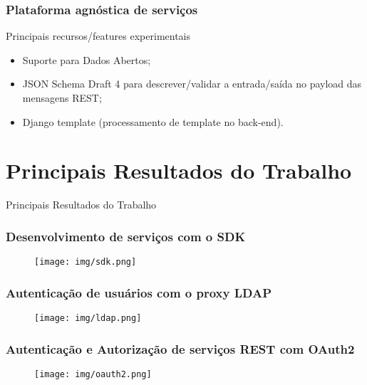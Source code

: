 \documentclass{beamer}
\begin{document}
\begin{frame}
  \frametitle{Plataforma agnóstica de serviços}

  \begin{exampleblock}{Principais recursos/features experimentais}
  
	  \begin{itemize}
 	    \item<1->Suporte para Dados Abertos;
    	    \item<1->JSON Schema Draft 4 para descrever/validar a entrada/saída no payload das mensagens REST;
	    \item<1->Django template (processamento de template no back-end).
	  \end{itemize}

  \end{exampleblock}

  
\end{frame}







\section{Principais Resultados do Trabalho}


\begin{frame}[c]{ }
\centering
  \huge{Principais Resultados do Trabalho}
\end{frame}



\begin{frame}
  \frametitle{Desenvolvimento de serviços com o SDK}

	\begin{figure}
	\centering
		\texttt{[image: img/sdk.png]}
	\end{figure}
  
\end{frame}


\begin{frame}
  \frametitle{Autenticação de usuários com o proxy LDAP}

	\begin{figure}
	\centering
		\texttt{[image: img/ldap.png]}
	\end{figure}
  
\end{frame}


\begin{frame}
  \frametitle{Autenticação e Autorização de serviços REST com OAuth2}

	\begin{figure}
	\centering
		\texttt{[image: img/oauth2.png]}
	\end{figure}
  
\end{frame}
\end{document}

